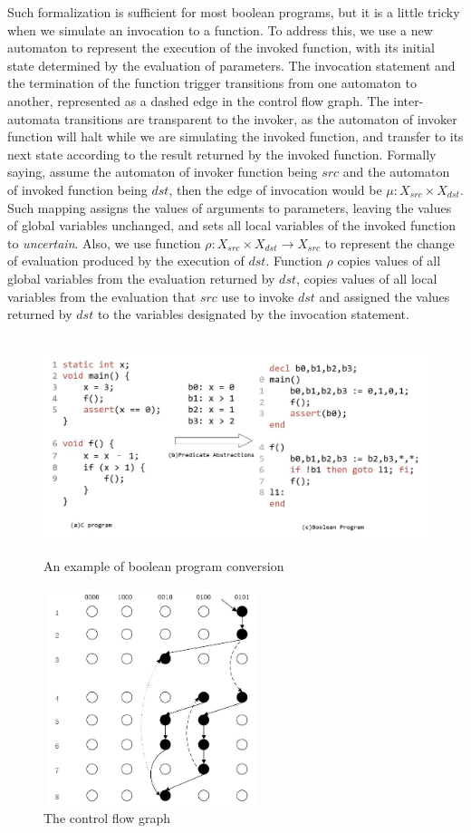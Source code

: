 Such formalization is sufficient for most boolean programs, but it is a little tricky when we simulate an invocation to a function.
To address this, we use a new automaton to represent the execution of the invoked function, with its initial state determined by the evaluation of parameters.
The invocation statement and the termination of the function trigger transitions from one automaton to another, represented as a dashed edge in the control flow graph.
The inter-automata transitions are transparent to the invoker, as the automaton of invoker function will halt while we are simulating the invoked function, and transfer to its next state according to the result returned by the invoked function.
Formally saying, assume the automaton of invoker function being $src$ and the automaton of invoked function being $dst$, then the edge of invocation would be $\mu:X_{src}\times X_{dst}$. Such mapping assigns the values of arguments to parameters, leaving the values of global variables unchanged, and sets all local variables of the invoked function to {\it uncertain}.
Also, we use function $\rho:X_{src}\times X_{dst} \to X_{src}$ to represent the change of evaluation produced by the execution of $dst$. Function $\rho$ copies values of all global variables from the evaluation returned by $dst$, copies values of all local variables from the evaluation that $src$ use to invoke $dst$ and assigned the values returned by $dst$ to the variables designated by the invocation statement.

\begin{figure}
\centering
\includegraphics[width=5in,height=2.5in]{Fig2-1.jpg}
\caption{An example of boolean program conversion}
\label{fig:BPC}
\end{figure}

\begin{figure}
\centering
\includegraphics[width=2.5in,height=2.5in]{Fig2-2.jpg}
\caption{The control flow graph}
\label{fig:CFG}
\end{figure}

